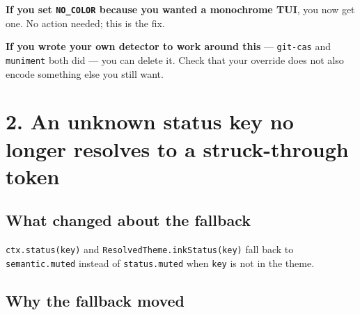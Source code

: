 \textbf{If you set \texttt{N\allowbreak{}O\allowbreak{}\_\allowbreak{}C\allowbreak{}O\allowbreak{}L\allowbreak{}O\allowbreak{}R} because you wanted a monochrome TUI}, you now get one. No action needed; this is the fix.

\textbf{If you wrote your own detector to work around this} --- \texttt{g\allowbreak{}i\allowbreak{}t\allowbreak{}-\allowbreak{}c\allowbreak{}a\allowbreak{}s} and \texttt{m\allowbreak{}u\allowbreak{}n\allowbreak{}i\allowbreak{}m\allowbreak{}e\allowbreak{}n\allowbreak{}t} both did --- you can delete it. Check that your override does not also encode something else you still want.

\section{2. An unknown status key no longer resolves to a struck-through token}\label{record-273-an-unknown-status-key-no-longer-resolves-to-a-struck-through-token}

\subsection{What changed about the fallback}\label{record-273-what-changed-about-the-fallback}

\texttt{c\allowbreak{}t\allowbreak{}x\allowbreak{}.\allowbreak{}s\allowbreak{}t\allowbreak{}a\allowbreak{}t\allowbreak{}u\allowbreak{}s\allowbreak{}(\allowbreak{}k\allowbreak{}e\allowbreak{}y\allowbreak{})} and \texttt{R\allowbreak{}e\allowbreak{}s\allowbreak{}o\allowbreak{}l\allowbreak{}v\allowbreak{}e\allowbreak{}d\allowbreak{}T\allowbreak{}h\allowbreak{}e\allowbreak{}m\allowbreak{}e\allowbreak{}.\allowbreak{}i\allowbreak{}n\allowbreak{}k\allowbreak{}S\allowbreak{}t\allowbreak{}a\allowbreak{}t\allowbreak{}u\allowbreak{}s\allowbreak{}(\allowbreak{}k\allowbreak{}e\allowbreak{}y\allowbreak{})} fall back to \texttt{s\allowbreak{}e\allowbreak{}m\allowbreak{}a\allowbreak{}n\allowbreak{}t\allowbreak{}i\allowbreak{}c\allowbreak{}.\allowbreak{}m\allowbreak{}u\allowbreak{}t\allowbreak{}e\allowbreak{}d} instead of \texttt{s\allowbreak{}t\allowbreak{}a\allowbreak{}t\allowbreak{}u\allowbreak{}s\allowbreak{}.\allowbreak{}m\allowbreak{}u\allowbreak{}t\allowbreak{}e\allowbreak{}d} when \texttt{k\allowbreak{}e\allowbreak{}y} is not in the theme.

\subsection{Why the fallback moved}\label{record-273-why-the-fallback-moved}

